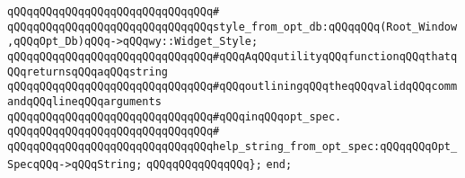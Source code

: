 \verb|qQQqqQQqqQQqqQQqqQQqqQQqqQQqqQQq#|\newline
\verb|qQQqqQQqqQQqqQQqqQQqqQQqqQQqqQQqstyle_from_opt_db:qQQqqQQq(Root_Window,qQQqOpt_Db)qQQq->qQQqwy::Widget_Style;|\newline
\newline
\verb|qQQqqQQqqQQqqQQqqQQqqQQqqQQqqQQq#qQQqAqQQqutilityqQQqfunctionqQQqthatqQQqreturnsqQQqaqQQqstring|\newline
\verb|qQQqqQQqqQQqqQQqqQQqqQQqqQQqqQQq#qQQqoutliningqQQqtheqQQqvalidqQQqcommandqQQqlineqQQqarguments|\newline
\verb|qQQqqQQqqQQqqQQqqQQqqQQqqQQqqQQq#qQQqinqQQqopt_spec.|\newline
\verb|qQQqqQQqqQQqqQQqqQQqqQQqqQQqqQQq#|\newline
\verb|qQQqqQQqqQQqqQQqqQQqqQQqqQQqqQQqhelp_string_from_opt_spec:qQQqqQQqOpt_SpecqQQq->qQQqString;|\newline
\verb|qQQqqQQqqQQqqQQq};|\newline
\newline
\verb|end;|\newline

